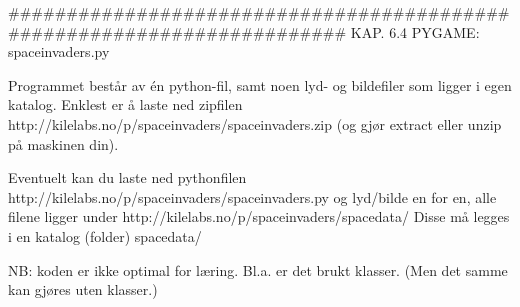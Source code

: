 ######################################################################## 
KAP. 6.4  PYGAME: spaceinvaders.py 

Programmet består av én python-fil, samt noen lyd- og bildefiler 
som ligger i egen katalog. 
Enklest er å laste ned zipfilen 
http://kilelabs.no/p/spaceinvaders/spaceinvaders.zip 
(og gjør extract eller unzip på maskinen din). 

Eventuelt kan du laste ned pythonfilen 
http://kilelabs.no/p/spaceinvaders/spaceinvaders.py
og lyd/bilde en for en, alle filene ligger under
http://kilelabs.no/p/spaceinvaders/spacedata/
Disse må legges i en katalog (folder) spacedata/

NB: koden er ikke optimal for læring. 
Bl.a. er det brukt klasser. 
(Men det samme kan gjøres uten klasser.) 
